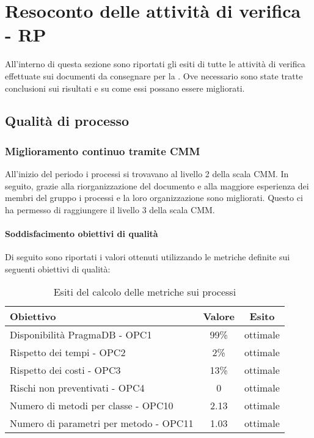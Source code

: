 \documentclass[PdQ.tex]{subfiles}
\begin{document}
\section{Resoconto delle attività di verifica - RP}
All'interno di questa sezione sono riportati gli esiti di tutte le attività di verifica effettuate sui documenti da consegnare per la \RP{}. Ove necessario sono state tratte conclusioni sui risultati e su come essi possano essere migliorati.

\subsection{Qualità di processo}
		\subsubsection{Miglioramento continuo tramite CMM}
	
		All'inizio del periodo i processi si trovavano al livello 2 della scala CMM. In seguito, grazie alla riorganizzazione del documento \NPdocRP{} e alla maggiore esperienza dei membri del gruppo i processi e la loro organizzazione sono migliorati. Questo ci ha permesso di raggiungere il livello 3 della scala CMM. 

		\paragraph{Soddisfacimento obiettivi di qualità}
			Di seguito sono riportati i valori ottenuti utilizzando le metriche definite sui seguenti obiettivi di qualità:
			\begin{table}[h]
				\centering
				\begin{tabular}{l c c}
					\hline
					\rule[-0.3cm]{0cm}{0.8cm}
					\textbf{Obiettivo} & \textbf{Valore} & \textbf{Esito} \\
					\hline
					\rule[0cm]{0cm}{0.4cm}
					Disponibilità PragmaDB - OPC1 & 99\% & ottimale \\
					\rule[0cm]{0cm}{0.4cm}
					Rispetto dei tempi - OPC2 & 2\% & ottimale \\
					\rule[0cm]{0cm}{0.4cm}
					Rispetto dei costi - OPC3 & 13\% & ottimale\\ 
					\rule[0cm]{0cm}{0.4cm}
					Rischi non preventivati - OPC4 & 0 & ottimale\\ 
					\rule[0cm]{0cm}{0.4cm}
					Numero di metodi per classe - OPC10 & 2.13 & ottimale\\ 
					\rule[0cm]{0cm}{0.4cm}
					Numero di parametri per metodo - OPC11 & 1.03 & ottimale\\ 
					\hline
				\end{tabular}
				\caption{Esiti del calcolo delle metriche sui processi}
			\end{table}
		
\end{document}
